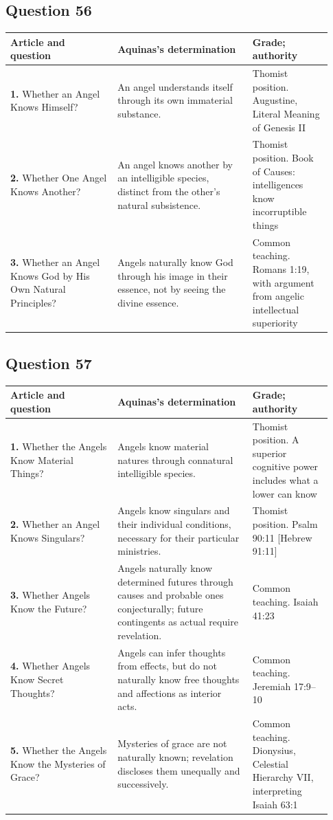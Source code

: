 \subsection{Question 56}
\begin{longtable}{@{}>{\raggedright\arraybackslash}p{0.31\linewidth}>{\raggedright\arraybackslash}p{0.39\linewidth}>{\raggedright\arraybackslash}p{0.23\linewidth}@{}}
\toprule
Article and question & Aquinas's determination & Grade; authority\\
\midrule\endhead
\textbf{1.} Whether an Angel Knows Himself? & An angel understands itself through its own immaterial substance. & Thomist position. Augustine, Literal Meaning of Genesis II\\
\textbf{2.} Whether One Angel Knows Another? & An angel knows another by an intelligible species, distinct from the other's natural subsistence. & Thomist position. Book of Causes: intelligences know incorruptible things\\
\textbf{3.} Whether an Angel Knows God by His Own Natural Principles? & Angels naturally know God through his image in their essence, not by seeing the divine essence. & Common teaching. Romans 1:19, with argument from angelic intellectual superiority\\
\bottomrule
\end{longtable}
\subsection{Question 57}
\begin{longtable}{@{}>{\raggedright\arraybackslash}p{0.31\linewidth}>{\raggedright\arraybackslash}p{0.39\linewidth}>{\raggedright\arraybackslash}p{0.23\linewidth}@{}}
\toprule
Article and question & Aquinas's determination & Grade; authority\\
\midrule\endhead
\textbf{1.} Whether the Angels Know Material Things? & Angels know material natures through connatural intelligible species. & Thomist position. A superior cognitive power includes what a lower can know\\
\textbf{2.} Whether an Angel Knows Singulars? & Angels know singulars and their individual conditions, necessary for their particular ministries. & Thomist position. Psalm 90:11 [Hebrew 91:11]\\
\textbf{3.} Whether Angels Know the Future? & Angels naturally know determined futures through causes and probable ones conjecturally; future contingents as actual require revelation. & Common teaching. Isaiah 41:23\\
\textbf{4.} Whether Angels Know Secret Thoughts? & Angels can infer thoughts from effects, but do not naturally know free thoughts and affections as interior acts. & Common teaching. Jeremiah 17:9--10\\
\textbf{5.} Whether the Angels Know the Mysteries of Grace? & Mysteries of grace are not naturally known; revelation discloses them unequally and successively. & Common teaching. Dionysius, Celestial Hierarchy VII, interpreting Isaiah 63:1\\
\bottomrule
\end{longtable}
